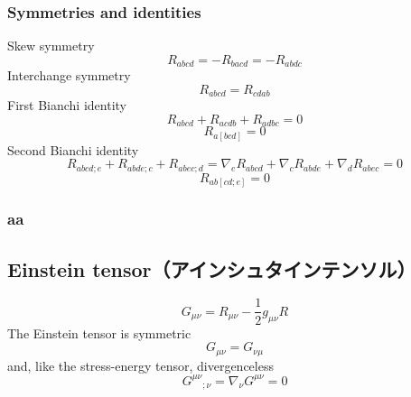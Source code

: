 \subsubsection{Symmetries and identities}
Skew symmetry
\[ R_{abcd} = -R_{bacd} = -R_{abdc} \]
Interchange symmetry
\[ R_{abcd} = R_{cdab} \]
First Bianchi identity
\[ R_{abcd} + R_{acdb} + R_{adbc} = 0 \]
\[ R_{a \left[ bcd \right] } = 0 \]
Second Bianchi identity
\[ R_{abcd;e} + R_{abde;c} + R_{abec;d} = \nabla_e R_{abcd} + \nabla_c R_{abde} + \nabla_d R_{abec} = 0 \]
\[ R_{ab \left[ cd;e \right] } = 0 \]

\subsubsection{aa}


%
%
\subsection{Einstein tensor（アインシュタインテンソル）}
\begin{equation}
  G_{\mu \nu} = R_{\mu \nu} - \frac{1}{2} g_{\mu \nu} R
\end{equation}
The Einstein tensor is symmetric
\begin{equation}
  G_{\mu \nu } = G_{\nu \mu }
\end{equation}
and, like the stress-energy tensor, divergenceless
\begin{equation}
  {G^{\mu \nu }}_{;\nu } = {\nabla }_{\nu } G^{\mu \nu } = 0
\end{equation}
